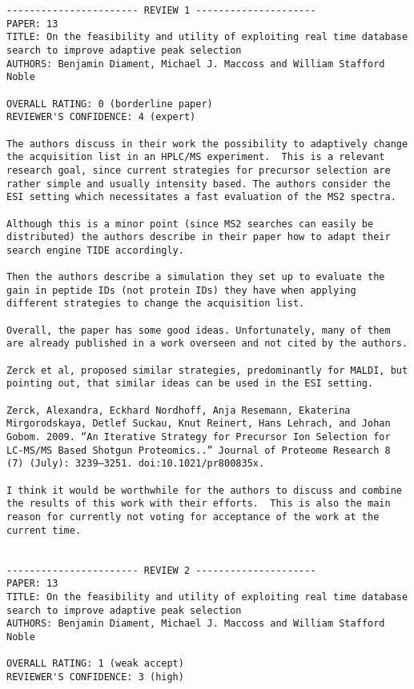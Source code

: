 \documentclass[12pt]{article}
\begin{document}
\begin{verbatim}
----------------------- REVIEW 1 ---------------------
PAPER: 13
TITLE: On the feasibility and utility of exploiting real time database
search to improve adaptive peak selection
AUTHORS: Benjamin Diament, Michael J. Maccoss and William Stafford Noble

OVERALL RATING: 0 (borderline paper)
REVIEWER'S CONFIDENCE: 4 (expert)

The authors discuss in their work the possibility to adaptively change
the acquisition list in an HPLC/MS experiment.  This is a relevant
research goal, since current strategies for precursor selection are
rather simple and usually intensity based. The authors consider the
ESI setting which necessitates a fast evaluation of the MS2 spectra.

Although this is a minor point (since MS2 searches can easily be
distributed) the authors describe in their paper how to adapt their
search engine TIDE accordingly.

Then the authors describe a simulation they set up to evaluate the
gain in peptide IDs (not protein IDs) they have when applying
different strategies to change the acquisition list.

Overall, the paper has some good ideas. Unfortunately, many of them
are already published in a work overseen and not cited by the authors.

Zerck et al, proposed similar strategies, predominantly for MALDI, but
pointing out, that similar ideas can be used in the ESI setting.

Zerck, Alexandra, Eckhard Nordhoff, Anja Resemann, Ekaterina
Mirgorodskaya, Detlef Suckau, Knut Reinert, Hans Lehrach, and Johan
Gobom. 2009. “An Iterative Strategy for Precursor Ion Selection for
LC-MS/MS Based Shotgun Proteomics..” Journal of Proteome Research 8
(7) (July): 3239–3251. doi:10.1021/pr800835x.

I think it would be worthwhile for the authors to discuss and combine
the results of this work with their efforts.  This is also the main
reason for currently not voting for acceptance of the work at the
current time.


----------------------- REVIEW 2 ---------------------
PAPER: 13
TITLE: On the feasibility and utility of exploiting real time database
search to improve adaptive peak selection
AUTHORS: Benjamin Diament, Michael J. Maccoss and William Stafford Noble

OVERALL RATING: 1 (weak accept)
REVIEWER'S CONFIDENCE: 3 (high)


\end{verbatim}
\end{document}
